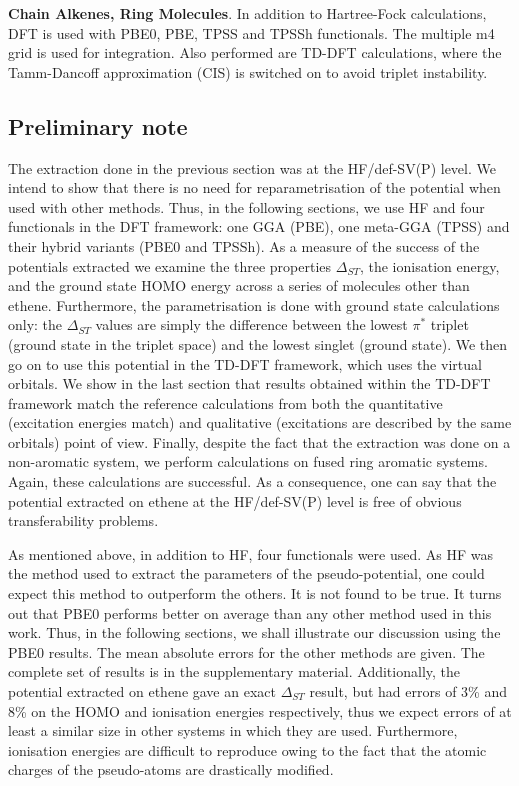 \documentclass[aip]{revtex4-1}
\begin{document}
\textbf{Chain Alkenes, Ring Molecules}. In addition to Hartree-Fock calculations, DFT is used with PBE0, PBE, TPSS and TPSSh functionals. \cite{pbe0,pbe,tpss,tpssh} The multiple m4 grid is used for integration. Also performed are TD-DFT calculations, where the Tamm-Dancoff approximation (CIS) \cite{tammdancoff} is switched on to avoid triplet instability.

\subsection{Preliminary note}
The extraction done in the previous section was at the HF/def-SV(P) level.
We intend to show that there is no need for reparametrisation of the potential
when used with other methods.
Thus, in the following sections, we use HF and four functionals in the DFT framework:
one GGA (PBE), one meta-GGA (TPSS) and their hybrid variants (PBE0 and TPSSh). As a measure of the success of the potentials extracted we examine the three properties $\Delta_{ST}$, the ionisation energy, and the ground state HOMO energy across a series of molecules other than ethene. Furthermore, the parametrisation is done with ground state calculations only:
the $\Delta_{ST}$ values are simply the difference between the  lowest $\pi^*$ triplet (ground state in the triplet space) and the lowest singlet (ground state).
We then go on to use this potential in the TD-DFT framework, which uses the virtual orbitals.
We show in the last section that results obtained within the TD-DFT framework
match the reference calculations from both the quantitative (excitation energies match)
and qualitative (excitations are described by the same orbitals) point of view. 
Finally, despite the fact that the extraction was done on a non-aromatic system,
we perform calculations on fused ring aromatic systems.
Again, these calculations are successful.
As a consequence, one can say that the potential extracted on ethene at the HF/def-SV(P)
level is free of obvious transferability problems.

As mentioned above, in addition to HF, four functionals were used.
As HF was the method used to extract the parameters of the pseudo-potential, one could expect
this method to outperform the others.
It is not found to be true.
It turns out that PBE0 performs better on average than any other method used in this work.
Thus, in the following sections, we shall illustrate our discussion using the PBE0 results.
The mean absolute errors for the other methods are given.
The complete set of results is in the supplementary material.
Additionally, the potential extracted on ethene gave an exact $\Delta_{ST}$ result, but had errors of 3\% and 8\% on the HOMO and ionisation energies respectively, thus we expect errors of at least a similar size in other systems in which they are used. Furthermore, ionisation energies are difficult to reproduce
owing to the fact that the atomic charges of the pseudo-atoms are drastically modified.
\end{document}
